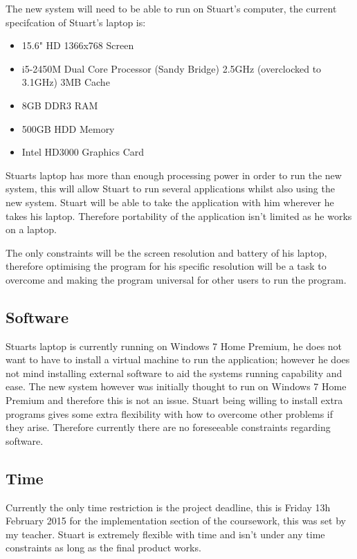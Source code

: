 {{{The new system will need to be able to run on Stuart's computer, the current specifcation of Stuart's laptop is:
\begin{itemize}
    \item 15.6" HD 1366x768 Screen
    \item i5-2450M Dual Core Processor (Sandy Bridge) 2.5GHz (overclocked to 3.1GHz) 3MB Cache
    \item 8GB DDR3 RAM
    \item 500GB HDD Memory
    \item Intel HD3000 Graphics Card
\end{itemize}

Stuarts laptop has more than enough processing power in order to run the new system, this will allow Stuart to run several applications whilst also using the new system. Stuart will be able to take the application with him wherever he takes his laptop. Therefore portability of the application isn't limited as he works on a laptop.

The only constraints will be the screen resolution and battery of his laptop, therefore optimising the program for his specific resolution will be a task to overcome and making the program universal for other users to run the program.

\subsection{Software}

Stuarts laptop is currently running on Windows 7 Home Premium, he does not want to have to install a virtual machine to run the application; however he does not mind installing external software to aid the systems running capability and ease. The new system however was initially thought to run on Windows 7 Home Premium and therefore this is not an issue. Stuart being willing to install extra programs gives some extra flexibility with how to overcome other problems if they arise. Therefore currently there are no foreseeable constraints regarding software.

\subsection{Time}

Currently the only time restriction is the project deadline, this is Friday 13h February 2015 for the implementation section of the coursework, this was set by my teacher. Stuart is extremely flexible with time and isn't under any time constraints as long as the final product works. 

}}}
